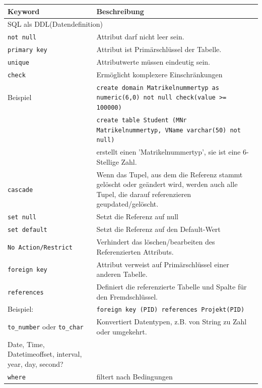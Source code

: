\documentclass{article}
\begin{document}
\begin{center}
  \begin{longtable}{|p{4cm}|p{7cm}|}
    \hline
    \textbf{Keyword} & \textbf{Beschreibung} \\
    \hline
    \multicolumn{2}{|p{11cm}|}{SQL als DDL(Datendefinition)} \\
    \hline
    \texttt{not null} & Attribut darf nicht leer sein. \\
    \hline
    \texttt{primary key} & Attribut ist Primärschlüssel der Tabelle. \\
    \hline
    \texttt{unique} & Attributwerte müssen eindeutig sein. \\
    \hline
    \texttt{check} & Ermöglicht komplexere Einschränkungen \\
    \hline
    Beispiel & \texttt{create domain Matrikelnummertyp as numeric(6,0) not null check(value >= 100000)} \\
    & \texttt{create table Student (MNr Matrikelnummertyp, VName varchar(50) not null)} \\
    & erstellt einen 'Matrikelnummertyp', sie ist eine 6-Stellige Zahl. \\
    \hline
    \texttt{cascade} & Wenn das Tupel, aus dem die Referenz stammt gelöscht oder geändert wird, werden auch alle Tupel, die darauf referenzieren geupdated/gelöscht. \\
    \hline
    \texttt{set null} & Setzt die Referenz auf null \\
    \hline
    \texttt{set default} & Setzt die Referenz auf den Default-Wert \\
    \hline
    \texttt{No Action/Restrict} & Verhindert das löschen/bearbeiten des Referenzierten Attributs.  \\
    \hline
    \texttt{foreign key} & Attribut verweist auf Primärschlüssel einer anderen Tabelle. \\
    \hline
    \texttt{references} & Definiert die referenzierte Tabelle und Spalte für den Fremdschlüssel. \\
    \hline
    Beispiel: & \texttt{foreign key (PID) references Projekt(PID)} \\
    \hline
    \texttt{to\_number} oder \texttt{to\_char} & Konvertiert Datentypen, z.B. von String zu Zahl oder umgekehrt. \\
    \hline
    Date, Time, Datetimeoffset, interval, year, day, second? & \\
    \hline
    \texttt{where} & filtert nach Bedingungen \\

\end{longtable}
\end{center}
\end{document}
